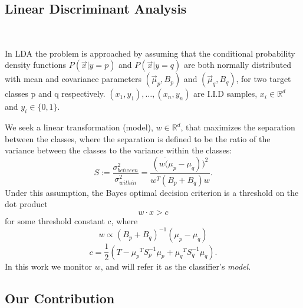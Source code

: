 \documentclass{sig-alternate-05-2015}
\begin{document}
\subsection{Linear Discriminant Analysis}
\\\par In LDA the problem is approached by assuming that the conditional probability
density functions $P(\vec x|y=p)$ and $P(\vec x|y=q)$ are both normally distributed with 
mean and covariance parameters $\left(\vec \mu_p, B_p\right)$ and 
$\left(\vec \mu_q, B_q\right)$, for two target classes p and q respectively.
${(x_1,y_1),\ldots,(x_n,y_n)}$ are I.I.D samples, $x_i \in \mathbb{R}^d$
and $y_i \in \{0,1\}$. 

We seek a linear transformation (model), $w \in \mathbb{R}^d $,
that maximizes the separation between the classes, where the separation is
defined to be the ratio of the variance between the classes to the variance
within the classes:
\begin{equation*}
S := \frac{\sigma^2_{between}}{\sigma^2_{within}} = \frac{(w \dot (\mu_p -
\mu_q))^2}{w^T(B_p+B_q)w}.
\end{equation*}
Under this assumption, the Bayes optimal decision criterion is a threshold on the 
dot product
\begin{equation*} \label{eq:decision}
w \cdot x > c
\end{equation*}
for some threshold constant c, where
\begin{equation} \label{eq:w}
w \propto (B_p+B_q)^{-1}(\mu_p - \mu_q)
\end{equation}
\begin{equation} \label{eq:c}
c = \frac{1}{2}(T-{\mu_p}^T S_p^{-1} {\mu_p}+{\mu_q}^T S_q^{-1} {\mu_q}).
\end{equation}
In this work we monitor $w$, and will refer it as the
classifier's \textit{model}.
\subsection{Our Contribution}
\end{document}
